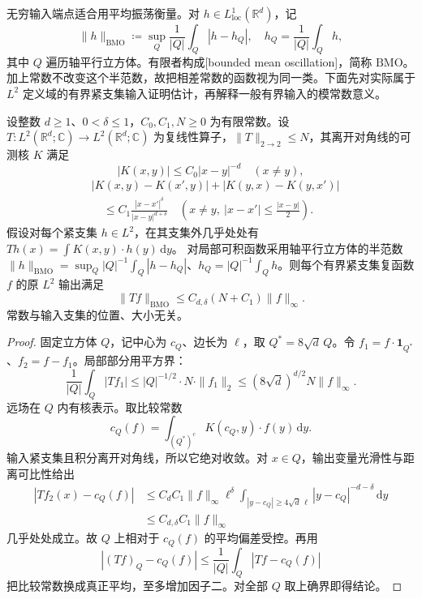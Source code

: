 \ProseParagraphBreak

无穷输入端点适合用平均振荡衡量。对 \(h\in L^1_{\mathrm{loc}}(\mathbb R^d)\)，记
\[
 \|h\|_{\mathrm{BMO}}\coloneqq
 \sup_Q\frac1{|Q|}\int_Q|h-h_Q|,
 \quad h_Q=\frac1{|Q|}\int_Qh,
\]
其中 \(Q\) 遍历轴平行立方体。有限者构成[bounded mean oscillation]，简称 \(\mathrm{BMO}\)。加上常数不改变这个半范数，故把相差常数的函数视为同一类。下面先对实际属于 \(L^2\) 定义域的有界紧支集输入证明估计，再解释一般有界输入的模常数意义。

\begin{proposition}\label{b2:prop:18-infinity-bmo}
设整数 \(d\geq1\)、\(0<\delta\leq1\)，\(C_0,C_1,N\geq0\) 为有限常数。设 \(T:L^2(\mathbb R^d;\mathbb C)\to L^2(\mathbb R^d;\mathbb C)\) 为复线性算子，\(\|T\|_{2\to2}\leq N\)，其离开对角线的可测核 \(K\) 满足
\[
 |K(x,y)|\leq C_0|x-y|^{-d}\quad(x\ne y),
\]
\[
 \begin{aligned}
 &|K(x,y)-K(x',y)|+|K(y,x)-K(y,x')|\\
 &\quad\leq C_1\frac{|x-x'|^\delta}{|x-y|^{d+\delta}}
 \quad\left(x\ne y,\ |x-x'|\leq\frac{|x-y|}2\right).
 \end{aligned}
\]
假设对每个紧支集 \(h\in L^2\)，在其支集外几乎处处有
\(Th(x)=\int K(x,y)\cdot h(y)\,\mathrm dy\)。
对局部可积函数采用轴平行立方体的半范数
\(\|h\|_{\mathrm{BMO}}=\sup_Q|Q|^{-1}\int_Q|h-h_Q|\)、\(h_Q=|Q|^{-1}\int_Qh\)。则每个有界紧支集复函数 \(f\) 的原 \(L^2\) 输出满足
\[
 \|Tf\|_{\mathrm{BMO}}\leq C_{d,\delta}(N+C_1)\|f\|_\infty.
\]
常数与输入支集的位置、大小无关。
\end{proposition}
\begin{proof}
固定立方体 \(Q\)，记中心为 \(c_Q\)、边长为 \(\ell\)，取 \(Q^*=8\sqrt d\,Q\)。令
\(f_1=f\cdot\mathbf1_{Q^*}\)、\(f_2=f-f_1\)。局部部分用平方界：
\[
 \frac1{|Q|}\int_Q|Tf_1|
 \leq |Q|^{-1/2}\cdot N\cdot\|f_1\|_2
 \leq(8\sqrt d)^{d/2}N\|f\|_\infty.
\]
远场在 \(Q\) 内有核表示。取比较常数
\[
 c_Q(f)=\int_{(Q^*)^c}K(c_Q,y)\cdot f(y)\,\mathrm dy.
\]
输入紧支集且积分离开对角线，所以它绝对收敛。对 \(x\in Q\)，输出变量光滑性与距离可比性给出
\[
 \begin{aligned}
 |Tf_2(x)-c_Q(f)|
 &\leq C_dC_1\|f\|_\infty\ell^\delta
       \int_{|y-c_Q|\geq4\sqrt d\,\ell}
             |y-c_Q|^{-d-\delta}\,\mathrm dy\\
 &\leq C_{d,\delta}C_1\|f\|_\infty
 \end{aligned}
\]
几乎处处成立。故 \(Q\) 上相对于 \(c_Q(f)\) 的平均偏差受控。再用
\[
 |(Tf)_Q-c_Q(f)|\leq\frac1{|Q|}\int_Q|Tf-c_Q(f)|
\]
把比较常数换成真正平均，至多增加因子二。对全部 \(Q\) 取上确界即得结论。
\end{proof}

